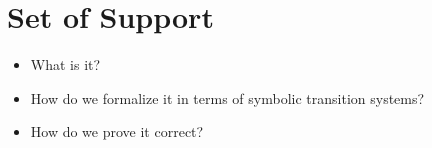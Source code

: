 \section{Set of Support}
\label{sec:support}

\begin{itemize}
    \item What is it?
    \item How do we formalize it in terms of symbolic transition systems?
    \item How do we prove it correct?
\end{itemize}